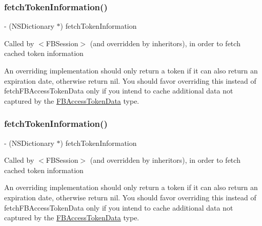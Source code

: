\subsubsection{\texorpdfstring{fetch\+Token\+Information()}{fetchTokenInformation()}\hspace{0.1cm}{\footnotesize\ttfamily [2/5]}}
{\footnotesize\ttfamily -\/ (N\+S\+Dictionary $\ast$) fetch\+Token\+Information \begin{DoxyParamCaption}{ }\end{DoxyParamCaption}}

Called by $<$\+F\+B\+Session$>$ (and overridden by inheritors), in order to fetch cached token information

An overriding implementation should only return a token if it can also return an expiration date, otherwise return nil. You should favor overriding this instead of {\ttfamily fetch\+F\+B\+Access\+Token\+Data} only if you intend to cache additional data not captured by the \hyperlink{interfaceFBAccessTokenData}{F\+B\+Access\+Token\+Data} type. \mbox{\label{interfaceFBSessionTokenCachingStrategy_a08b75ac08ae3b7a1ad769f3b026f857c}} 
\subsubsection{\texorpdfstring{fetch\+Token\+Information()}{fetchTokenInformation()}\hspace{0.1cm}{\footnotesize\ttfamily [3/5]}}
{\footnotesize\ttfamily -\/ (N\+S\+Dictionary $\ast$) fetch\+Token\+Information \begin{DoxyParamCaption}{ }\end{DoxyParamCaption}}

Called by $<$\+F\+B\+Session$>$ (and overridden by inheritors), in order to fetch cached token information

An overriding implementation should only return a token if it can also return an expiration date, otherwise return nil. You should favor overriding this instead of {\ttfamily fetch\+F\+B\+Access\+Token\+Data} only if you intend to cache additional data not captured by the \hyperlink{interfaceFBAccessTokenData}{F\+B\+Access\+Token\+Data} type. \mbox{\label{interfaceFBSessionTokenCachingStrategy_a08b75ac08ae3b7a1ad769f3b026f857c}} 
